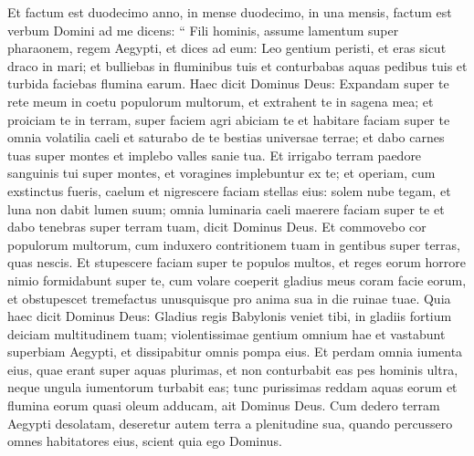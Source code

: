 \begin{biblechapter}
\begin{biblechapter}
\begin{biblechapter}
\begin{biblechapter}
\begin{biblechapter}
\begin{biblechapter}
\begin{biblechapter}
\begin{biblechapter}
\begin{biblechapter}
\begin{biblechapter}
\begin{biblechapter}
\begin{biblechapter}
\begin{biblechapter}
\begin{biblechapter}
\begin{biblechapter}
\begin{biblechapter}
\begin{biblechapter}
\begin{biblechapter}
\begin{biblechapter}
\begin{biblechapter}
\begin{biblechapter}
\begin{biblechapter}
\begin{biblechapter}
\begin{biblechapter}
\begin{biblechapter}
\begin{biblechapter}
\begin{biblechapter}
\begin{biblechapter}
\begin{biblechapter}
\begin{biblechapter}
\begin{biblechapter}
\begin{biblechapter}
\verse Et factum est duodecimo anno, in mense duodecimo, in una mensis, factum est verbum Domini ad me dicens: 
\verse “ Fili hominis, assume lamentum super pharaonem, regem Aegypti, et dices ad eum:
 Leo gentium peristi,
 et eras sicut draco in mari;
 et bulliebas in fluminibus tuis
 et conturbabas aquas pedibus tuis
 et turbida faciebas flumina earum.
 \verse Haec dicit Dominus Deus:
 Expandam super te rete meum
 in coetu populorum multorum,
 et extrahent te in sagena mea;
 \verse et proiciam te in terram,
 super faciem agri abiciam te
 et habitare faciam super te omnia volatilia caeli
 et saturabo de te bestias universae terrae;
 \verse et dabo carnes tuas super montes
 et implebo valles sanie tua.
 \verse Et irrigabo terram paedore
 sanguinis tui super montes,
 et voragines implebuntur ex te;
 \verse et operiam, cum exstinctus fueris, caelum
 et nigrescere faciam stellas eius:
 solem nube tegam,
 et luna non dabit lumen suum;
 \verse omnia luminaria caeli
 maerere faciam super te
 et dabo tenebras super terram tuam,
 dicit Dominus Deus.
 \verse Et commovebo cor populorum multorum, cum induxero contritionem tuam in gentibus super terras, quas nescis. 
\verse Et stupescere faciam super te populos multos, et reges eorum horrore nimio formidabunt super te, cum volare coeperit gladius meus coram facie eorum, et obstupescet tremefactus unusquisque pro anima sua in die ruinae tuae. 
\verse Quia haec dicit Dominus Deus: Gladius regis Babylonis veniet tibi,
 \verse in gladiis fortium deiciam multitudinem tuam;
 violentissimae gentium omnium hae
 et vastabunt superbiam Aegypti,
 et dissipabitur omnis pompa eius.
 \verse Et perdam omnia iumenta eius,
 quae erant super aquas plurimas,
 et non conturbabit eas pes hominis ultra,
 neque ungula iumentorum turbabit eas;
 \verse tunc purissimas reddam aquas eorum
 et flumina eorum quasi oleum adducam,
 ait Dominus Deus.
 \verse Cum dedero terram Aegypti desolatam,
 deseretur autem terra a plenitudine sua, quando percussero omnes habitatores eius,
 scient quia ego Dominus.

\end{biblechapter}
\end{biblechapter}
\end{biblechapter}
\end{biblechapter}
\end{biblechapter}
\end{biblechapter}
\end{biblechapter}
\end{biblechapter}
\end{biblechapter}
\end{biblechapter}
\end{biblechapter}
\end{biblechapter}
\end{biblechapter}
\end{biblechapter}
\end{biblechapter}
\end{biblechapter}
\end{biblechapter}
\end{biblechapter}
\end{biblechapter}
\end{biblechapter}
\end{biblechapter}
\end{biblechapter}
\end{biblechapter}
\end{biblechapter}
\end{biblechapter}
\end{biblechapter}
\end{biblechapter}
\end{biblechapter}
\end{biblechapter}
\end{biblechapter}
\end{biblechapter}
\end{biblechapter}
